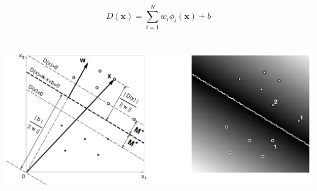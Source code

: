 \documentclass[12pt,a4paper]{article}
\newenvironment{Figure}
  {\par\medskip\noindent\minipage{\linewidth}}
  {\endminipage\par\medskip}
\begin{document}
\begin{equation}
D(\textbf{x}) = \sum_{i=1}^{N} w_i \phi_{i}(\textbf{x}) + b 
\label{hyperplane_Decision}
\end{equation}

\begin{Figure}
 \centering
 \includegraphics[height=71mm]{boserSVM_Training.png}
 \label{svm_training}
\end{Figure} 
\end{document}
